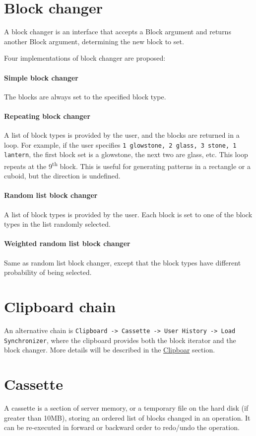 \documentclass{report}
\def \sup #1{\textsuperscript{#1}}
\begin{document}
			\section{Block changer}
				A block changer is an interface that accepts a Block argument and returns another Block argument,
				determining the new block to set.

				Four implementations of block changer are proposed:
				\paragraph{Simple block changer} The blocks are always set to the specified block type.
				\paragraph{Repeating block changer} A list of block types is provided by the user, and the blocks are
				returned in a loop. For example, if the user specifies \texttt{1 glowstone, 2 glass, 3 stone, 1 lantern},
				the first block set is a glowstone, the next two are glass, etc. This loop repeats at the 9\sup{th}
				block. This is useful for generating patterns in a rectangle or a cuboid, but the direction is undefined.
				\paragraph{Random list block changer} A list of block types is provided by the user. Each block is set
				to one of the block types in the list randomly selected.
				\paragraph{Weighted random list block changer} Same as random list block changer, except that the block
				types have different probability of being selected.

			\section{Clipboard chain}
				An alternative chain is \texttt{Clipboard -> Cassette -> User History -> Load Synchronizer}, where the
				clipboard provides both the block iterator and the block changer. More details will be described in the
				\hyperref[sec:clipboard]{Clipboar} section.

			\section{Cassette}
				A cassette is a section of server memory, or a temporary file on the hard disk (if greater than 10MB),
				storing an ordered list of blocks changed in an operation. It can be re-executed in forward or backward
				order to redo/undo the operation.
\end{document}

